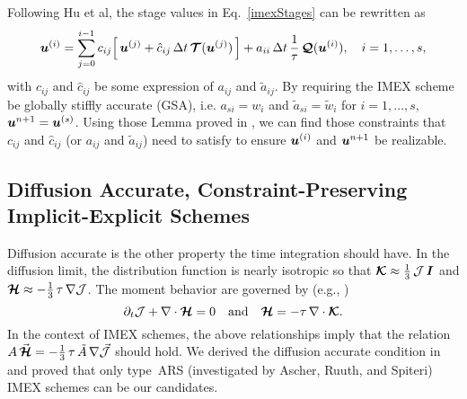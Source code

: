 Following Hu et al\cite{hu_etal_2018}, the stage values in Eq.~\eqref{imexStages} can be rewritten as
\begin{equation}
  \boldsymbol{u}^{(i)}
  =\sum_{j=0}^{i-1}c_{ij}\Big[\,\boldsymbol{u}^{(j)}+\hat{c}_{ij}\,\Delta t\,\boldsymbol{\mathcal{T}}(\boldsymbol{u}^{(j)})\,\Big]
  +a_{ii}\,\Delta t\,\frac{1}{\tau}\,\boldsymbol{\mathcal{Q}}(\boldsymbol{u}^{(i)}),\quad i=1,\ldots,s,
  \label{eq:imexStagesRewrite}
\end{equation}
with $c_{ij}$ and $\hat{c}_{ij}$ be some expression of $a_{ij}$ and $\tilde{a}_{ij}$.
By requiring the IMEX scheme be globally stiffly accurate (GSA), i.e. $a_{si}=w_{i}$ and $\tilde{a}_{si}=\tilde{w}_{i}$ for $i=1,\ldots,s$, $\boldsymbol{u}^{n+1} = \boldsymbol{u}^{(s)}$.
Using those Lemma proved in \cite{chu_etal_2018}, we can find those constraints that $c_{ij}$ and $\hat{c}_{ij}$ (or $a_{ij}$ and $\tilde{a}_{ij}$) need to satisfy to ensure $\boldsymbol{u}^{(i)}$ and $\boldsymbol{u}^{n+1}$ be realizable.


\subsection{Diffusion Accurate, Constraint-Preserving Implicit-Explicit Schemes}

Diffusion accurate is the other property the time integration should have.
In the diffusion limit, the distribution function is nearly isotropic so that $\boldsymbol{\mathcal{K}}\approx\frac{1}{3}\,\mathcal{J}\,\boldsymbol{I}$ and $\boldsymbol{\mathcal{H}}\approx-\frac{1}{3}\,\tau\,\nabla\mathcal{J}$.
The moment behavior are governed by (e.g., \cite{jinLevermore_1996})
\begin{equation}
  \partial_{t}{\mathcal{J}} + \nabla\cdot\boldsymbol{\mathcal{H}} = 0
  \quad\text{and}\quad
  \boldsymbol{\mathcal{H}} = - \tau\,\nabla\cdot\boldsymbol{\mathcal{K}}.  
  \label{eq:diffusionLimit}
\end{equation}
In the context of IMEX schemes, the above relationships imply that the relation $A\,\vec{\boldsymbol{\mathcal{H}}}=-\frac{1}{3}\,\tau\,\tilde{A}\,\nabla\vec{\mathcal{J}}$ should hold. 
We derived the diffusion accurate condition in \cite{chu_etal_2018} and proved that only type~ARS (investigated by Ascher, Ruuth, and Spiteri\cite{ascher_etal_1997}) IMEX schemes can be our candidates.


